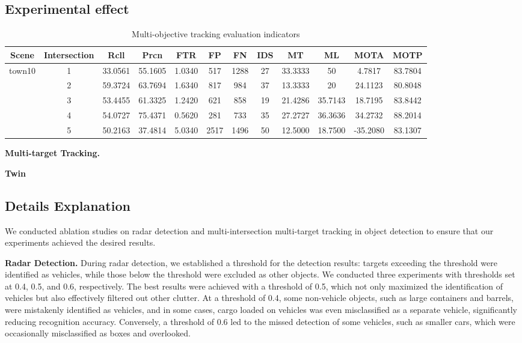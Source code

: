\subsection{Experimental effect}

\begin{table*}[t] 
	\centering
	\caption{Multi-objective tracking evaluation indicators}
	\label{tab:example}
	\begin{tabular}{cccccccccccc}
		\toprule
		Scene & Intersection & Rcll & Prcn & FTR & FP & FN & IDS & MT & ML & MOTA & MOTP\\
		\midrule
		town10 & 1 & 33.0561 & 55.1605 & 1.0340 & 517 & 1288 & 27 & 33.3333 & 50 & 4.7817 & 83.7804\\
		 & 2 & 59.3724 & 63.7694 & 1.6340 & 817 & 984 & 37 & 13.3333 & 20 & 24.1123 & 80.8048\\
		 & 3 & 53.4455 & 61.3325 & 1.2420 & 621 & 858 & 19 & 21.4286 & 35.7143 & 18.7195 & 83.8442\\
		 & 4 & 54.0727 & 75.4371 & 0.5620 & 281 & 733 & 35 & 27.2727 & 36.3636 & 34.2732 & 88.2014\\
		 & 5 & 50.2163 & 37.4814 & 5.0340 & 2517 & 1496 & 50 & 12.5000 & 18.7500 & -35.2080 & 83.1307\\
		\bottomrule
	\end{tabular}
\end{table*}

\textbf{Multi-target Tracking.}


\textbf{Twin}

\subsection{Details Explanation}

We conducted ablation studies on radar detection and multi-intersection multi-target tracking in object detection to ensure that our experiments achieved the desired results.

\textbf{Radar Detection.}
During radar detection, we established a threshold for the detection results: targets exceeding the threshold were identified as vehicles, while those below the threshold were excluded as other objects. 
We conducted three experiments with thresholds set at 0.4, 0.5, and 0.6, respectively. 
The best results were achieved with a threshold of 0.5, which not only maximized the identification of vehicles but also effectively filtered out other clutter. 
At a threshold of 0.4, some non-vehicle objects, such as large containers and barrels, were mistakenly identified as vehicles, and in some cases, cargo loaded on vehicles was even misclassified as a separate vehicle, significantly reducing recognition accuracy. 
Conversely, a threshold of 0.6 led to the missed detection of some vehicles, such as smaller cars, which were occasionally misclassified as boxes and overlooked.


